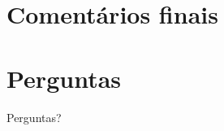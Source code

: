 \documentclass{beamer}
\begin{document}
\section{Comentários finais}
\section{Perguntas}
\begin{frame}
\Huge{\centerline{Perguntas?}}
\end{frame}

\end{document}
